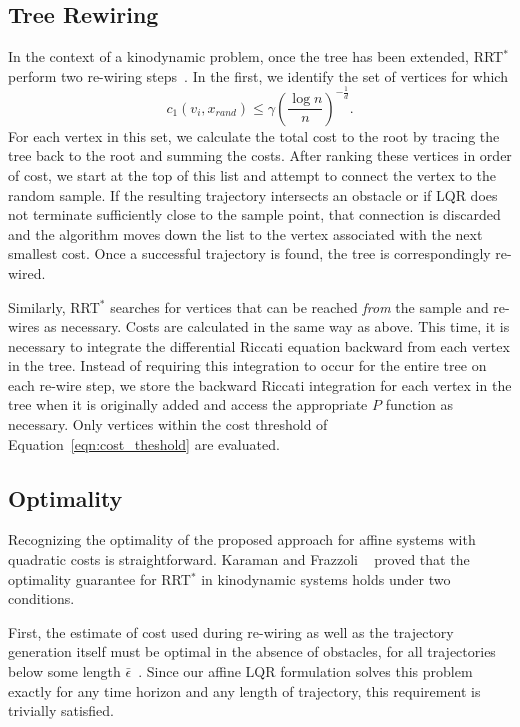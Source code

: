 \documentclass[letterpaper, 10pt, english, conference]{IEEEtran}
\begin{document}
\subsection{Tree Rewiring}

In the context of a kinodynamic problem, once the tree has been
extended, RRT$^*$ perform two re-wiring steps~\cite{Karaman.Frazzoli:CDC10}. In
the first, we identify the set of vertices for which
\begin{equation}
c_1(v_i,x_{rand}) \leq \gamma \left( \frac{\log n}{n} \right)^{-\frac{1}{d}}.
\label{eqn:cost_theshold}
\end{equation}
For each vertex in this set, we calculate the total cost to the root
by tracing the tree back to the root and summing the costs. After
ranking these vertices in order of cost, we start at the top of this
list and attempt to connect the vertex to the random sample. If the
resulting trajectory intersects an obstacle or if LQR does not
terminate sufficiently close to the sample point, that connection is
discarded and the algorithm moves down the list to the vertex
associated with the next smallest cost. Once a successful trajectory
is found, the tree is correspondingly re-wired.

Similarly, RRT$^*$ searches for vertices that can be reached {\em
  from} the sample and re-wires as necessary. Costs are calculated in
the same way as above. This time, it is necessary to integrate the
differential Riccati equation backward from each vertex in the
tree. Instead of requiring this integration to occur for the entire
tree on each re-wire step, we store the backward Riccati integration
for each vertex in the tree when it is originally added and access the
appropriate $P$ function as necessary. Only vertices within the cost
threshold of Equation~\ref{eqn:cost_theshold} are evaluated.


\subsection{Optimality}

Recognizing the optimality of the proposed approach for affine systems
with quadratic costs
is straightforward. 
Karaman and Frazzoli ~\cite{Karaman.Frazzoli:CDC10} proved
that the optimality guarantee for RRT$^*$
in kinodynamic systems holds under two
conditions. 

First, the estimate of cost used during re-wiring as well as the
trajectory generation itself must be optimal in the absence of
obstacles, for all trajectories below some length
$\bar\epsilon$~\cite{Karaman.Frazzoli:CDC10}.  Since our affine LQR
formulation solves this problem exactly for any time horizon and any
length of trajectory, this requirement is trivially satisfied.
\end{document}

